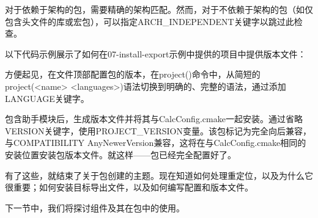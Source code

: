 对于依赖于架构的包，需要精确的架构匹配。然而，对于不依赖于架构的包（如仅包含头文件的库或宏包），可以指定ARCH\_INDEPENDENT关键字以跳过此检查。

以下代码示例展示了如何在07-install-export示例中提供的项目中提供版本文件：



方便起见，在文件顶部配置包的版本，在project()命令中，从简短的project(<name> <languages>)语法切换到明确的、完整的语法，通过添加LANGUAGE关键字。

包含助手模块后，生成版本文件并将其与CalcConfig.cmake一起安装。通过省略VERSION关键字，使用PROJECT\_VERSION变量。该包标记为完全向后兼容，与COMPATIBILITY AnyNewerVersion兼容，这将在与CalcConfig.cmake相同的安装位置安装包版本文件。就这样——包已经完全配置好了。

有了这些，就结束了关于包创建的主题。现在知道如何处理重定位，以及为什么它很重要；如何安装目标导出文件，以及如何编写配置和版本文件。

下一节中，我们将探讨组件及其在包中的使用。































